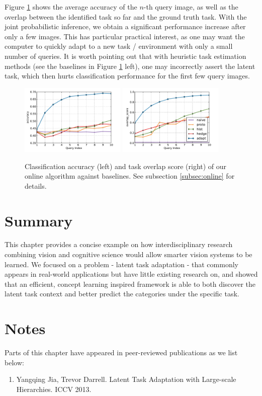Figure \ref{fig:online} shows the average accuracy of the $n$-th query image, as well as the overlap between the identified task so far and the ground truth task. With the joint probabilistic inference, we obtain a significant performance increase after only a few images. This has particular practical interest, as one may want the computer to quickly adapt to a new task / environment with only a small number of queries. It is worth pointing out that with heuristic task estimation methods (see the baselines in Figure \ref{fig:online} left), one may incorrectly assert the latent task, which then hurts classification performance for the first few query images.

\begin{figure}
    \centering
    \includegraphics[width=0.45\textwidth]{figs/taskadaptation/online_accuracy.pdf}%
    \includegraphics[width=0.45\textwidth]{figs/taskadaptation/online_overlap_score.pdf}
    \caption{Classification accuracy (left) and task overlap score (right) of our online algorithm against baselines. See subsection \ref{subsec:online} for details.}\label{fig:online}
\end{figure}

\section{Summary}
This chapter provides a concise example on how interdisciplinary research combining vision and cognitive science would allow smarter vision systems to be learned. We focused on a problem - latent task adaptation - that commonly appears in real-world applications but have little existing research on, and showed that an efficient, concept learning inspired framework is able to both discover the latent task context and better predict the categories under the specific task.

\section*{Notes}
Parts of this chapter have appeared in peer-reviewed publications as we list below:
\begin{enumerate}
\item Yangqing Jia, Trevor Darrell. Latent Task Adaptation with Large-scale Hierarchies. ICCV 2013.
\end{enumerate}